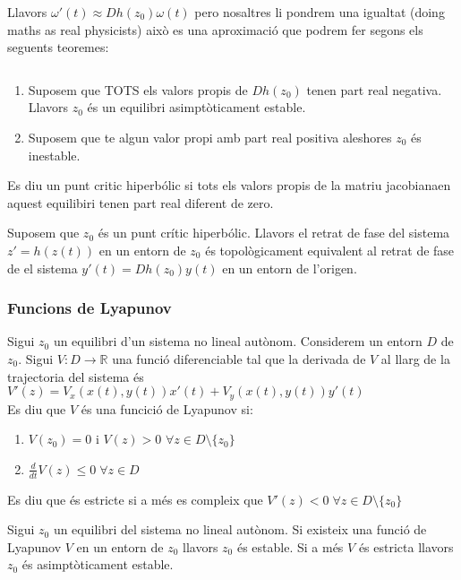 \documentclass[../main.tex]{subfiles}
\begin{document}
Llavors $\omega'(t) \approx Dh(z_0)\omega(t)$ pero nosaltres li pondrem una igualtat (doing maths as real physicists) això es una aproximació que podrem fer segons els seguents teoremes:
\begin{teorema}
$\;$
\begin{enumerate}
\item Suposem que TOTS els valors propis de $Dh(z_0)$ tenen part real negativa. Llavors $z_0$ és un equilibri asimptòticament estable.
\item Suposem que te algun valor propi amb part real positiva aleshores $z_0$ és inestable.
\end{enumerate}
\end{teorema}
\begin{definicio}
Es diu un punt critic hiperbólic si tots els valors propis  de la matriu jacobianaen aquest equilibiri tenen part real diferent de zero.
\end{definicio}
\begin{teorema}
Suposem que $z_0$ és un punt crític hiperbólic. Llavors el retrat de fase del sistema $z' = h(z(t))$ en un entorn de $z_0$ és topològicament equivalent al retrat de fase de el sistema $y'(t) = Dh(z_0)y(t)$ en un entorn de l'origen.
\end{teorema}
\subsubsection{Funcions de Lyapunov}
\begin{definicio}
Sigui $z_0$ un equilibri d'un sistema no lineal autònom. Considerem un entorn $D$ de $z_0$. Sigui $V: D \to \mathbb{R}$ una funció diferenciable tal que la derivada de $V$ al llarg de la trajectoria del sistema és $V'(z)=V_x(x(t), y(t))x'(t) + V_y(x(t), y(t))y'(t)$\\
Es diu que $V$ és una funcició de Lyapunov si:
\begin{enumerate}
	\item $V(z_0) = 0$ i $V(z) > 0$ $\forall z \in D \setminus \{z_0\}$
	\item $\frac{d}{dt} V(z) \leq 0\; \forall z \in D$
\end{enumerate}
Es diu que és estricte si a més es compleix que $V'(z)<0\;\forall z \in D \setminus \{z_0\}$
\end{definicio}
\begin{teorema}
Sigui $z_0$ un equilibri del sistema no lineal autònom. Si existeix una funció de Lyapunov $V$ en un entorn de $z_0$ llavors $z_0$ és estable. Si a més $V$ és estricta llavors $z_0$ és asimptòticament estable.
\end{teorema}
\end{document}
